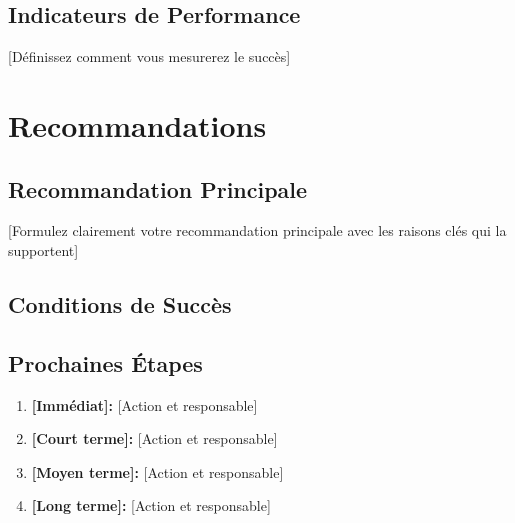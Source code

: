 \subsection{Indicateurs de Performance}

[Définissez comment vous mesurerez le succès]









\section{Recommandations}

\subsection{Recommandation Principale}

[Formulez clairement votre recommandation principale avec les raisons clés qui la supportent]

\subsection{Conditions de Succès}


\subsection{Prochaines Étapes}

\begin{enumerate}
\item \textbf{[Immédiat]:} [Action et responsable]
\item \textbf{[Court terme]:} [Action et responsable]
\item \textbf{[Moyen terme]:} [Action et responsable]
\item \textbf{[Long terme]:} [Action et responsable]
\end{enumerate}

